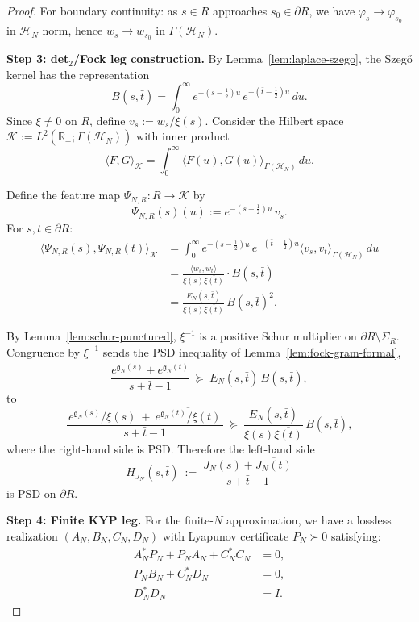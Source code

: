 \documentclass[11pt]{article}
\theoremstyle{definition}
\theoremstyle{remark}
\begin{document}
\begin{proof}
For boundary continuity: as $s \in R$ approaches $s_0 \in \partial R$, we have $\varphi_s \to \varphi_{s_0}$ in $\mathcal{H}_N$ norm, hence $w_s \to w_{s_0}$ in $\Gamma(\mathcal{H}_N)$.

\medskip
\noindent\textbf{Step 3: det$_2$/Fock leg construction.}
By Lemma~\ref{lem:laplace-szego}, the Szegő kernel has the representation
\[
  B(s,\bar t) = \int_0^\infty e^{-(s-\frac{1}{2})u} \, e^{-(\bar t - \frac{1}{2})u} \, du.
\]
Since $\xi \neq 0$ on $R$, define $v_s := w_s / \xi(s)$. Consider the Hilbert space $\mathcal{K} := L^2(\mathbb{R}_+; \Gamma(\mathcal{H}_N))$ with inner product
\[
  \langle F, G \rangle_{\mathcal{K}} = \int_0^\infty \langle F(u), G(u) \rangle_{\Gamma(\mathcal{H}_N)} \, du.
\]

Define the feature map $\Psi_{N,R}: R \to \mathcal{K}$ by
\[
  \Psi_{N,R}(s)(u) := e^{-(s-\frac{1}{2})u} \, v_s.
\]
For $s,t \in \partial R$:
\begin{align}
  \langle \Psi_{N,R}(s), \Psi_{N,R}(t) \rangle_{\mathcal{K}} 
  &= \int_0^\infty e^{-(s-\frac{1}{2})u} \, e^{-(\bar t - \frac{1}{2})u} \langle v_s, v_t \rangle_{\Gamma(\mathcal{H}_N)} \, du\\
  &= \frac{\langle w_s, w_t \rangle}{\xi(s)\overline{\xi(t)}} \cdot B(s,\bar t)\\
  &= \frac{E_N(s,\bar t)}{\xi(s)\overline{\xi(t)}}\,B(s,\bar t)^2.
\end{align}

By Lemma~\ref{lem:schur-punctured}, \(\xi^{-1}\) is a positive Schur multiplier on \(\partial R \setminus \Sigma_R\). Congruence by \(\xi^{-1}\) sends the PSD inequality of Lemma~\ref{lem:fock-gram-formal},
\[
  \frac{e^{\mathfrak g_N(s)}+\overline{e^{\mathfrak g_N(t)}}}{s+\bar t-1}\ \succeq\ E_N(s,\bar t)\,B(s,\bar t),
\]
to
\[
  \frac{\,e^{\mathfrak g_N(s)}/\xi(s)\ +\ \overline{e^{\mathfrak g_N(t)}/\xi(t)}\,}{s+\bar t-1}\ \succeq\ \frac{E_N(s,\bar t)}{\xi(s)\overline{\xi(t)}}\,B(s,\bar t),
\]
where the right-hand side is PSD. Therefore the left-hand side
\[
  H_{J_N}(s,\bar t)\ :=\ \frac{J_N(s)+\overline{J_N(t)}}{s+\bar t-1}
\]
is PSD on \(\partial R\).

\medskip
\noindent\textbf{Step 4: Finite KYP leg.}
For the finite-$N$ approximation, we have a lossless realization $(A_N, B_N, C_N, D_N)$ with Lyapunov certificate $P_N \succ 0$ satisfying:
\begin{align}
  A_N^* P_N + P_N A_N + C_N^* C_N &= 0,\\
  P_N B_N + C_N^* D_N &= 0,\\
  D_N^* D_N &= I.
\end{align}


\end{proof}
\end{document}
